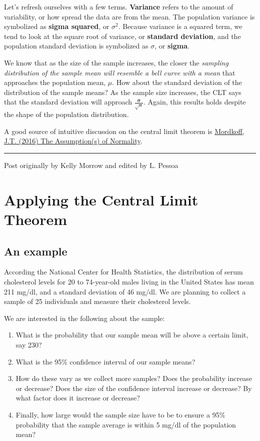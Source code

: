 \documentclass[]{book}
\providecommand{\tightlist}{%
  \setlength{\itemsep}{0pt}\setlength{\parskip}{0pt}}
\begin{document}
Let's refresh ourselves with a few terms. \textbf{Variance} refers to
the amount of variability, or how spread the data are from the mean. The
population variance is symbolized as \textbf{sigma squared}, or
\(\sigma^{2}\). Because variance is a squared term, we tend to look at
the square root of variance, or \textbf{standard deviation}, and the
population standard deviation is symbolized as \(\sigma\), or
\textbf{sigma}.

We know that as the size of the sample increases, the closer the
\emph{sampling distribution of the sample mean will resemble a bell
curve with a mean} that approaches the population mean, \(\mu\). How
about the standard deviation of the distribution of the sample means? As
the sample size increases, the CLT says that the standard deviation will
approach \(\frac{\mathbf{\sigma}}{\sqrt{n}}\). Again, this results holds
despite the shape of the population distribution.

A good source of intuitive discussion on the central limit theorem is
\href{http://www2.psychology.uiowa.edu/faculty/mordkoff/GradStats/part\%201/I.07\%20normal.pdf}{Mordkoff,
J.T. (2016) The Assumption(s) of Normality}.

\begin{center}\rule{0.5\linewidth}{\linethickness}\end{center}

Post originally by Kelly Morrow and edited by L. Pessoa

\chapter{Applying the Central Limit Theorem}\label{CLT_applying}

\section{An example}\label{an-example}

According the National Center for Health Statistics, the distribution of
serum cholesterol levels for 20 to 74-year-old males living in the
United States has mean 211 mg/dl, and a standard deviation of 46 mg/dl.
We are planning to collect a sample of 25 individuals and measure their
cholesterol levels.

We are interested in the following about the sample:

\begin{enumerate}
\def\labelenumi{\arabic{enumi}.}
\tightlist
\item
  What is the probability that our sample mean will be above a certain
  limit, say 230?
\item
  What is the 95\% confidence interval of our sample means?
\item
  How do these vary as we collect more samples? Does the probability
  increase or decrease? Does the size of the confidence interval
  increase or decrease? By what factor does it increase or decrease?
\item
  Finally, how large would the sample size have to be to ensure a 95\%
  probability that the sample average is within 5 mg/dl of the
  population mean?
\end{enumerate}
\end{document}

